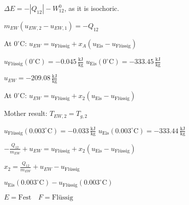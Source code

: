 \( \Delta E = -|Q_{12}| - W_{12}^{0} \), as it is isochoric.  

\( m_{EW} (u_{EW,2} - u_{EW,1}) = -Q_{12} \)  

At \( 0^\circ \text{C} \):  
\( u_{EW} = u_{\text{Flüssig}} + x_{A} (u_{\text{Eis}} - u_{\text{Flüssig}}) \)  

\( u_{\text{Flüssig}} (0^\circ \text{C}) = -0.045 \, \frac{\text{kJ}}{\text{kg}} \)  
\( u_{\text{Eis}} (0^\circ \text{C}) = -333.45 \, \frac{\text{kJ}}{\text{kg}} \)  

\( u_{EW} = -209.08 \, \frac{\text{kJ}}{\text{kg}} \)  

At \( 0^\circ \text{C} \):  
\( u_{EW} = u_{\text{Flüssig}} + x_{2} (u_{\text{Eis}} - u_{\text{Flüssig}}) \)  

Mother result:  
\( T_{EW,2} = T_{g,2} \)  

\( u_{\text{Flüssig}} (0.003^\circ \text{C}) = -0.033 \, \frac{\text{kJ}}{\text{kg}} \)  
\( u_{\text{Eis}} (0.003^\circ \text{C}) = -333.44 \, \frac{\text{kJ}}{\text{kg}} \)  

\( -\frac{Q_{12}}{m_{EW}} + u_{EW} = u_{\text{Flüssig}} + x_{2} (u_{\text{Eis}} - u_{\text{Flüssig}}) \)  

\( x_{2} = \frac{Q_{12}}{m_{EW}} + u_{EW} - u_{\text{Flüssig}} \)  

\( u_{\text{Eis}} (0.003^\circ \text{C}) - u_{\text{Flüssig}} (0.003^\circ \text{C}) \)  

\( E = \text{Fest} \quad F = \text{Flüssig} \)